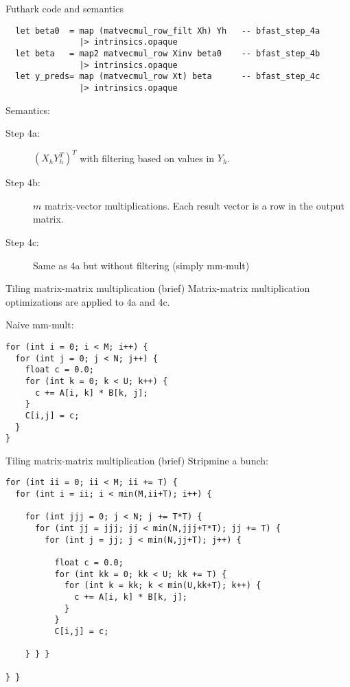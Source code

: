 \begin{frame}[fragile]{Futhark code and semantics}
\begin{verbatim}
  let beta0  = map (matvecmul_row_filt Xh) Yh   -- bfast_step_4a
               |> intrinsics.opaque
  let beta   = map2 matvecmul_row Xinv beta0    -- bfast_step_4b
               |> intrinsics.opaque
  let y_preds= map (matvecmul_row Xt) beta      -- bfast_step_4c
               |> intrinsics.opaque
\end{verbatim}
Semantics:
\begin{description}
  \item[Step 4a:] \((X_hY_h^T)^T\) with filtering based on values in \(Y_h\).
  \item[Step 4b:] \(m\) matrix-vector multiplications.
    Each result vector is a row in the output matrix.
  \item[Step 4c:] Same as 4a but without filtering (simply mm-mult)
\end{description}
\end{frame}

\begin{frame}[fragile]{Tiling matrix-matrix multiplication (brief)}
  Matrix-matrix multiplication optimizations are applied to 4a and 4c.

  Naive mm-mult:
\begin{verbatim}
for (int i = 0; i < M; i++) {
  for (int j = 0; j < N; j++) {
    float c = 0.0;
    for (int k = 0; k < U; k++) {
      c += A[i, k] * B[k, j];
    }
    C[i,j] = c;
  }
}
\end{verbatim}
\end{frame}

\begin{frame}[fragile]{Tiling matrix-matrix multiplication (brief)}
  Stripmine a bunch:
\begin{verbatim}
for (int ii = 0; ii < M; ii += T) {
  for (int i = ii; i < min(M,ii+T); i++) {

    for (int jjj = 0; j < N; j += T*T) {
      for (int jj = jjj; jj < min(N,jjj+T*T); jj += T) {
        for (int j = jj; j < min(N,jj+T); j++) {

          float c = 0.0;
          for (int kk = 0; kk < U; kk += T) {
            for (int k = kk; k < min(U,kk+T); k++) {
              c += A[i, k] * B[k, j];
            }
          }
          C[i,j] = c;

    } } }

} }
\end{verbatim}
\end{frame}

